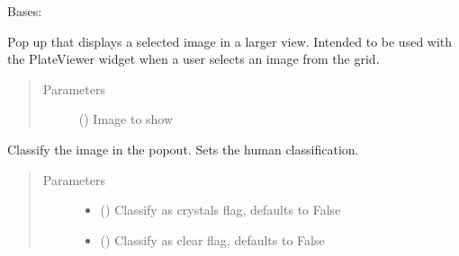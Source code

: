 \documentclass[letterpaper,10pt,english]{sphinxmanual}
\begin{document}
\begin{fulllineitems}
\label{\detokenize{polo.windows:polo.windows.image_pop_dialog.ImagePopDialog}}
Bases: 

Pop up that displays a selected image in a larger view. Intended
to be used with the PlateViewer widget when a user selects an
image from the grid.
\begin{quote}\begin{description}
\item[{Parameters}] \leavevmode
{} ({\hyperref[\detokenize{polo.crystallography:polo.crystallography.image.Image}]{}}) \textendash{} Image to show

\end{description}\end{quote}

\begin{fulllineitems}
\label{\detokenize{polo.windows:polo.windows.image_pop_dialog.ImagePopDialog.classify_image}}
Classify the image in the popout. Sets the human classification.
\begin{quote}\begin{description}
\item[{Parameters}] \leavevmode\begin{itemize}
\item {} 
 (\sphinxstyleliteralemphasis{\sphinxupquote{, }}) \textendash{} Classify as crystals flag, defaults to False

\item {} 
 (\sphinxstyleliteralemphasis{\sphinxupquote{, }}) \textendash{} Classify as clear flag, defaults to False


\end{itemize}
\end{description}
\end{quote}
\end{fulllineitems}
\end{fulllineitems}
\end{document}
